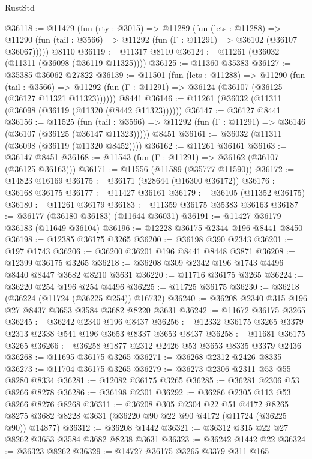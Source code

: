 \begin{lexlean}{RustStd}
\begin{coremodule}
@36118 := @11479
    (fun (rty : @3015) =>
    @11289
      (fun (lets : @11288) =>
      @11290 (fun (tail : @3566) => @11292 (fun (Γ : @11291) => @36102 (@36107 @36067)))))
    @8110
@36119 := @11317 @8110
@36124 := @11261 (@36032 (@11311 (@36098 (@36119 @11325))))
@36125 := @11360 @35383
@36127 := @35385 @36062 @27822
@36139 := @11501
    (fun (lets : @11288) =>
    @11290
      (fun (tail : @3566) =>
      @11292 (fun (Γ : @11291) => @36124 (@36107 (@36125 (@36127 @11321 @11323))))))
    @8441
@36146 := @11261 (@36032 (@11311 (@36098 (@36119 (@11320 (@8442 @11323))))))
@36147 := @36127 @8441
@36156 := @11525
    (fun (tail : @3566) => @11292 (fun (Γ : @11291) => @36146 (@36107 (@36125 (@36147 @11323)))))
    @8451
@36161 := @36032 (@11311 (@36098 (@36119 (@11320 @8452))))
@36162 := @11261 @36161
@36163 := @36147 @8451
@36168 := @11543 (fun (Γ : @11291) => @36162 (@36107 (@36125 @36163)))
@36171 := @11556 (@11589 (@35777 @11590))
@36172 := @14823 @16169
@36175 := @36171 (@28644 (@16300 @36172))
@36176 := @36168 @36175
@36177 := @11427 @36161
@36179 := @36105 (@11352 @36175)
@36180 := @11261 @36179
@36183 := @11359 @36175 @35383 @36163
@36187 := @36177 (@36180 @36183) (@11644 @36031)
@36191 := @11427 @36179 @36183 (@11649 @36104)
@36196 := @12228 @36175 @2344 @196 @8441 @8450
@36198 := @12385 @36175 @3265
@36200 := @36198 @390 @2343
@36201 := @197 @1743
@36206 := @36200 @36201 @196 @8441 @8448 @3871
@36208 := @12399 @36175 @3265
@36218 := @36208 @309 @2342 @196 @1743 @4496 @8440 @8447 @3682 @8210 @3631
@36220 := @11716 @36175 @3265
@36224 := @36220 @254 @196 @254 @4496
@36225 := @11725 @36175
@36230 := @36218 (@36224 (@11724 (@36225 @254)) @16732)
@36240 := @36208 @2340 @315 @196 @27 @8437 @3653 @3584 @3682 @8220 @3631
@36242 := @11672 @36175 @3265
@36245 := @36242 @2340 @196 @8437
@36256 := @12332 @36175 @3265 @3379 @2313 @2338 @541 @196 @3653 @8337 @3653 @8437
@36258 := @11681 @36175 @3265
@36266 := @36258 @1877 @2312 @2426 @53 @3653 @8335 @3379 @2436
@36268 := @11695 @36175 @3265
@36271 := @36268 @2312 @2426 @8335
@36273 := @11704 @36175 @3265
@36279 := @36273 @2306 @2311 @53 @55 @8280 @8334
@36281 := @12082 @36175 @3265
@36285 := @36281 @2306 @53 @8266 @8278
@36286 := @36198 @2301
@36292 := @36286 @2305 @113 @53 @8266 @8276 @8268
@36311 := @36208
    @305
    @2304
    @22
    @51
    @4172
    @8265
    @8275
    @3682
    @8228
    @3631
    (@36220 @90 @22 @90 @4172 (@11724 (@36225 @90)) @14877)
@36312 := @36208 @1442
@36321 := @36312 @315 @22 @27 @8262 @3653 @3584 @3682 @8238 @3631
@36323 := @36242 @1442 @22
@36324 := @36323 @8262
@36329 := @14727 @36175 @3265 @3379 @311 @165

\end{coremodule}
\end{lexlean}
